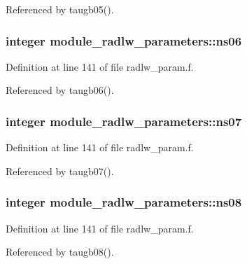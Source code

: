Referenced by taugb05().

\subsubsection[{\texorpdfstring{ns06}{ns06}}]{\setlength{\rightskip}{0pt plus 5cm}integer module\+\_\+radlw\+\_\+parameters\+::ns06}\hypertarget{group__module__radlw__main_gab936172cdf831f0b956c1475f175eca2}{}\label{group__module__radlw__main_gab936172cdf831f0b956c1475f175eca2}


Definition at line 141 of file radlw\+\_\+param.\+f.



Referenced by taugb06().

\subsubsection[{\texorpdfstring{ns07}{ns07}}]{\setlength{\rightskip}{0pt plus 5cm}integer module\+\_\+radlw\+\_\+parameters\+::ns07}\hypertarget{group__module__radlw__main_gac60030c5a4655c6cee7be71dd527ffdc}{}\label{group__module__radlw__main_gac60030c5a4655c6cee7be71dd527ffdc}


Definition at line 141 of file radlw\+\_\+param.\+f.



Referenced by taugb07().

\subsubsection[{\texorpdfstring{ns08}{ns08}}]{\setlength{\rightskip}{0pt plus 5cm}integer module\+\_\+radlw\+\_\+parameters\+::ns08}\hypertarget{group__module__radlw__main_ga0a9944341bfe4507370bb6b617ac0476}{}\label{group__module__radlw__main_ga0a9944341bfe4507370bb6b617ac0476}


Definition at line 141 of file radlw\+\_\+param.\+f.



Referenced by taugb08().

